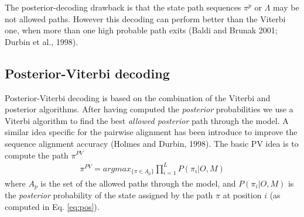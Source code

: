 \documentclass[11pt,english]{article}
\begin{document}
The posterior-decoding drawback is that the state path sequences 
$\pi^p$ or $\Lambda$ may be not allowed paths. However this 
decoding can perform better than the Viterbi one, when more than 
one high probable path exits (Baldi and Brunak 2001; Durbin et 
al., 1998). 


\subsection*{Posterior-Viterbi decoding}

Posterior-Viterbi decoding is based on the combination of 
the Viterbi and posterior algorithms. After having computed 
the {\em posterior} probabilities we use a Viterbi algorithm to find 
the best {\em allowed posterior} path through the model. 
A similar idea specific for the pairwise alignment has been
introduce to improve the sequence alignment accuracy (Holmes and Durbin, 1998).
The basic PV idea is to compute the path $\pi^{PV}$
\begin{eqnarray}
\pi^{PV}=argmax_{\{\pi \in A_p\}}\prod_{i=1}^L P(\pi_i|O,M)
\end{eqnarray}
where $A_p$ is the set of the allowed paths through the model, and
$P(\pi_i|O,M)$ is the {\em posterior} probability of the state 
assigned by the path $\pi$ at position $i$ (as computed in Eq.  \ref{eq:pos}). 
\end{document}
